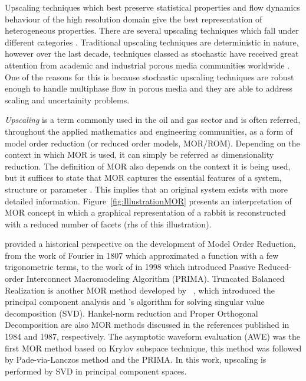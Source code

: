 \documentclass[preprint,12pt]{elsarticle}
\begin{document}
Upscaling techniques which best preserve statistical properties and flow dynamics behaviour of the high resolution domain give the best representation of heterogeneous properties. There are several upscaling techniques which fall under different categories \cite{Hasting_2001, Renard_1997, Szymkiewicz_2013}. Traditional upscaling techniques are deterministic in nature, however over the last decade, techniques classed as stochastic have received great attention from academic and industrial porous media communities worldwide \cite{Guilleminot_2012, Ravalec-Dupin_2010, Verwoerd_2009}. One of the reasons for this is because stochastic upscaling techniques are robust enough to handle multiphase flow in porous media and they are able to address scaling and uncertainity problems.

\medskip
{\it Upscaling} is a term commonly used in the oil and gas sector and is often referred, throughout the applied mathematics and engineering communities, as a form of model order reduction (or reduced order models, MOR/ROM). Depending on the context in which MOR is used, it can simply be referred as dimensionality reduction. The definition of MOR also depends on the context it is being used, but it suffices to state that MOR captures the essential features of a system, structure or parameter \cite{Schilders2008}. This implies that an original system exists with more detailed information. Figure~\ref{fig:IllustrationMOR} presents an interpretation of MOR concept in which a graphical representation of a rabbit is reconstructed with a reduced number of facets (rhs of this illustration).  

\citet{Schilders2008} provided a historical perspective on the development of Model Order Reduction, from the work of Fourier in 1807 which approximated a function with a few trigonometric terms, to the work of \citet{Odabasioglu_1998} in 1998 which introduced Passive Reduced-order Interconnect Macromodeling Algorithm (PRIMA). Truncated Balanced Realization  is another MOR method developed by \citeauthor{Moore_1981}~\cite{Moore_1981}, which introduced the principal component analysis \cite{Hotelling_1933} and \citeauthor{Golub1970}'s \cite{Golub1970} algorithm for solving singular value decomposition (SVD). Hankel-norm reduction \cite{Glover_1984} and Proper Orthogonal Decomposition \cite{Sirovich_1987} are also MOR methods discussed in the references published in 1984 and 1987, respectively. The asymptotic waveform evaluation (AWE) \cite{Pillage_1990} was the first MOR method based on Krylov subspace technique, this method was followed by Pade-via-Lanczos method \cite{Feldmann_1995} and the PRIMA. In this work, upscaling is performed by SVD in principal component spaces.
\end{document}
